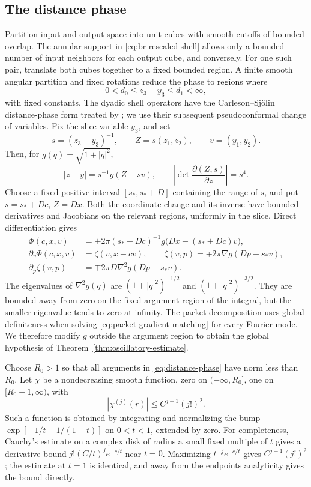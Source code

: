 \subsection{The distance phase}

Partition input and output space into unit cubes with smooth cutoffs
of bounded overlap.  The annular support in \eqref{eq:br-rescaled-shell}
allows only a bounded number of input neighbors for each output cube,
and conversely.  For one such pair, translate both cubes together to
a fixed bounded region.  A finite smooth angular partition and fixed
rotations reduce the phase to regions where
\[
 0<d_0\le z_3-y_3\le d_1<\infty,
\]
with fixed constants. The dyadic shell operators have the
Carleson--Sj\"olin distance-phase form treated by
\citet{GuoOhWangWuZhang2025}; we use their subsequent
pseudoconformal change of variables. Fix the slice variable $y_3$, and set
\[
 s=(z_3-y_3)^{-1},\qquad Z=s(z_1,z_2),\qquad v=(y_1,y_2).
\]
Then, for $g(q)=\sqrt{1+|q|^2}$,
\[
 |z-y|=s^{-1}g(Z-sv),\qquad
 \left|\det\frac{\partial(Z,s)}{\partial z}\right|=s^4.
\]
Choose a fixed positive interval $[s_*,s_*+D]$ containing the range
of $s$, and put $s=s_*+Dc$, $Z=Dx$.  Both the coordinate change and
its inverse have bounded derivatives and Jacobians on the relevant
regions, uniformly in the slice.  Direct differentiation gives
\begin{align}
 \Phi(c,x,v)&=\pm2\pi(s_*+Dc)^{-1}
 g\bigl(Dx-(s_*+Dc)v\bigr),\label{eq:distance-phase}\\
 \partial_v\Phi(c,x,v)&=\zeta(v,x-cv),\qquad
 \zeta(v,p)=\mp2\pi\nabla g(Dp-s_*v),\label{eq:distance-zeta}\\
 \partial_p\zeta(v,p)&=\mp2\pi D\nabla^2g(Dp-s_*v).
 \label{eq:distance-hessian}
\end{align}
The eigenvalues of $\nabla^2g(q)$ are
$(1+|q|^2)^{-1/2}$ and $(1+|q|^2)^{-3/2}$.  They are bounded away
from zero on the fixed argument region of the integral, but the smaller
eigenvalue tends to zero at infinity.  The packet decomposition uses
global definiteness when solving \eqref{eq:packet-gradient-matching}
for every Fourier mode.  We therefore modify $g$ outside the argument
region to obtain the global hypothesis of
Theorem~\ref{thm:oscillatory-estimate}.

Choose $R_0>1$ so that all arguments in \eqref{eq:distance-phase} have
norm less than $R_0$.  Let $\chi$ be a nondecreasing smooth function,
zero on $(-\infty,R_0]$, one on $[R_0+1,\infty)$, with
\[
 |\chi^{(j)}(r)|\le C^{j+1}(j!)^2.
\]
Such a function is obtained by integrating and normalizing the bump
$\exp[-1/t-1/(1-t)]$ on $0<t<1$, extended by zero.  For completeness,
Cauchy's estimate on a complex disk of radius a small fixed multiple
of $t$ gives a derivative bound
$j!(C/t)^j e^{-c/t}$ near $t=0$.  Maximizing $t^{-j}e^{-c/t}$ gives
$C^{j+1}(j!)^2$; the estimate at $t=1$ is identical, and away from
the endpoints analyticity gives the bound directly.

